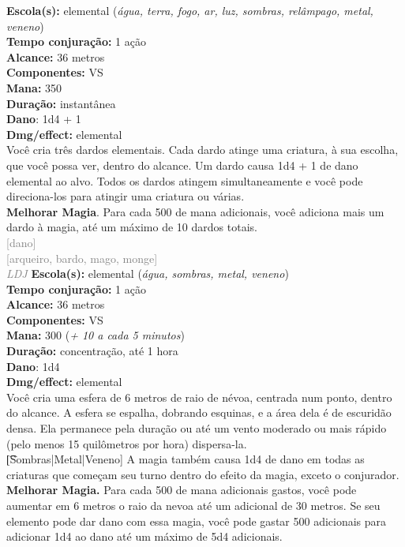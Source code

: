 \documentclass{RPG_Adventure}[2021/10/20]
\begin{document}
{\small \t \textbf{Escola(s):} elemental (\textit{água, terra, fogo, ar, luz, sombras, relâmpago, metal, veneno})\\\t \textbf{Tempo conjuração:} 1 ação\\\t \textbf{Alcance:} 36 metros\\\t \textbf{Componentes:} VS\\\t \textbf{Mana:} 350\\\t \textbf{Duração:} instantânea\\\t \textbf{Dano}: 1d4 + 1\\\t \textbf{Dmg/effect:} elemental\\}
{\normalsize Você cria três dardos elementais. Cada dardo atinge uma criatura, à sua escolha, que você possa ver, dentro do alcance. Um dardo causa 1d4 + 1 de dano elemental ao alvo. Todos os dardos atingem simultaneamente e você pode direciona-los para atingir uma criatura ou várias.\\\t \textbf{Melhorar Magia}. Para cada 500 de mana adicionais, você adiciona mais um dardo à magia, até um máximo de 10 dardos totais.\\}
{\scriptsize \textcolor{gray}{[dano]\\}}
{\scriptsize \textcolor{gray}{[arqueiro, bardo, mago, monge]\\}}
{\tiny \textcolor{gray}{\textit{LDJ}}}
{\small \t \textbf{Escola(s):} elemental (\textit{água, sombras, metal, veneno})\\\t \textbf{Tempo conjuração:} 1 ação\\\t \textbf{Alcance:} 36 metros\\\t \textbf{Componentes:} VS\\\t \textbf{Mana:} 300 (\textit{+ 10 a cada 5 minutos})\\\t \textbf{Duração:} concentração, até 1 hora\\\t \textbf{Dano}: 1d4\\\t \textbf{Dmg/effect:} elemental\\}
{\normalsize Você cria uma esfera de 6 metros de raio de névoa, centrada num ponto, dentro do alcance. A esfera se espalha, dobrando esquinas, e a área dela é de escuridão densa. Ela permanece pela duração ou até um vento moderado ou mais rápido (pelo menos 15 quilômetros por hora) dispersa-la.\\\t [Sombras|Metal|Veneno] A magia também causa 1d4 de dano em todas as criaturas que começam seu turno dentro do efeito da magia, exceto o conjurador.\\\t \textbf{Melhorar Magia.} Para cada 500 de mana adicionais gastos, você pode aumentar em 6 metros o raio da nevoa até um adicional de 30 metros. Se seu elemento pode dar dano com essa magia, você pode gastar 500 adicionais para adicionar 1d4 ao dano até um máximo de 5d4 adicionais.\\}
\end{document}

